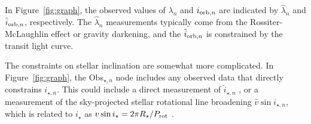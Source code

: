 \documentclass[twocolumn,times,linenumbers]{aastex631}
\begin{document}
In Figure~\ref{fig:graph}, the observed values of $\lambda_n$ and $i_{{\rm orb},n}$ are indicated by $\hat{\lambda}_n$ and $\hat{i}_{{\rm orb},n}$, respectively.
The $\hat{\lambda}_n$ measurements typically come from the Rossiter-McLaughlin effect or gravity darkening, and the $\hat{i}_{{\rm orb},n}$ is constrained by the transit light curve.

The constraints on stellar inclination are somewhat more complicated.
In Figure~\ref{fig:graph}, the Obs$_{\star,n}$ node includes any observed data that directly constrains $i_{\star,n}$.
This could include a direct measurement of $\hat{i}_{\star,n}$ \citep[via gravity-darkening or asteroseismology, for example][]{Barnes09, Chaplin13}, or a measurement of the sky-projected stellar rotational line broadening $\hat{v}\sin{i_{\star,n}}$, which is related to $i_\star$ as $v\sin{i_\star} = 2 \pi R_\star / P_{\rm rot}$ \citep{Masuda20}.
\end{document}
